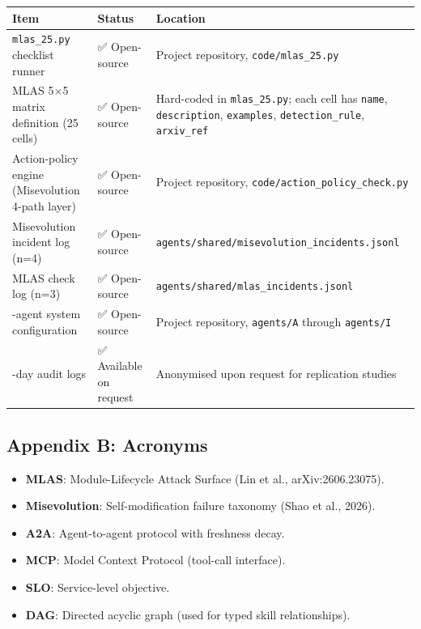 {\def\LTcaptype{none} %
\begin{longtable}[]{@{}
  >{\raggedright\arraybackslash}p{}
  >{\raggedright\arraybackslash}p{}
  >{\raggedright\arraybackslash}p{}@{}}
\toprule\noalign{}
\begin{minipage}[b]{\linewidth}\raggedright
Item
\end{minipage} & \begin{minipage}[b]{\linewidth}\raggedright
Status
\end{minipage} & \begin{minipage}[b]{\linewidth}\raggedright
Location
\end{minipage} \\
\midrule\noalign{}
\endhead
\bottomrule\noalign{}
\endlastfoot
\texttt{mlas\_25.py} checklist runner & ✅ Open-source & Project
repository, \texttt{code/mlas\_25.py} \\
MLAS 5×5 matrix definition (25 cells) & ✅ Open-source & Hard-coded in
\texttt{mlas\_25.py}; each cell has \texttt{name}, \texttt{description},
\texttt{examples}, \texttt{detection\_rule}, \texttt{arxiv\_ref} \\
Action-policy engine (Misevolution 4-path layer) & ✅ Open-source &
Project repository, \texttt{code/action\_policy\_check.py} \\
Misevolution incident log (n=4) & ✅ Open-source &
\texttt{agents/shared/misevolution\_incidents.jsonl} \\
MLAS check log (n=3) & ✅ Open-source &
\texttt{agents/shared/mlas\_incidents.jsonl} \\
8-agent system configuration & ✅ Open-source & Project repository,
\texttt{agents/A} through \texttt{agents/I} \\
60-day audit logs & ✅ Available on request & Anonymised upon request
for replication studies \\
\end{longtable}
}

\subsection{Appendix B: Acronyms}\label{appendix-b-acronyms}

\begin{itemize}
\tightlist
\item
  \textbf{MLAS}: Module-Lifecycle Attack Surface (Lin et al.,
  arXiv:2606.23075).
\item
  \textbf{Misevolution}: Self-modification failure taxonomy (Shao et
  al., 2026).
\item
  \textbf{A2A}: Agent-to-agent protocol with freshness decay.
\item
  \textbf{MCP}: Model Context Protocol (tool-call interface).
\item
  \textbf{SLO}: Service-level objective.
\item
  \textbf{DAG}: Directed acyclic graph (used for typed skill
  relationships).
\end{itemize}


